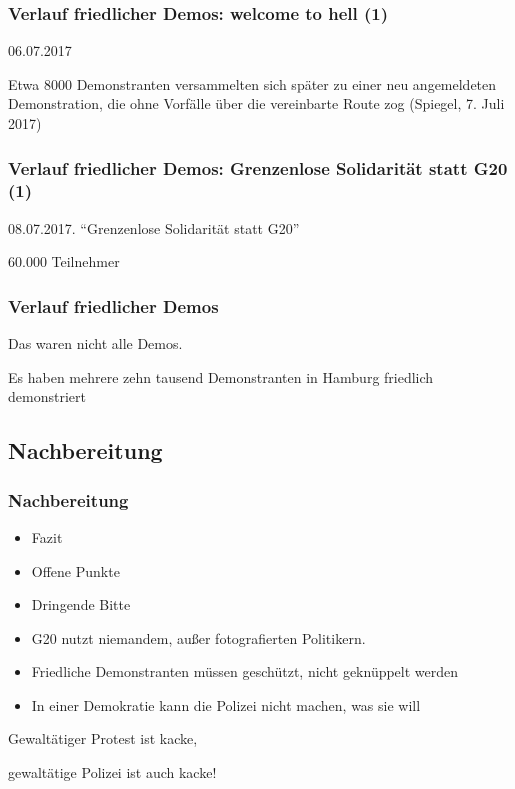 \documentclass[]{beamer}
\begin{document}
	\begin{frame}
	\frametitle{Verlauf friedlicher Demos: welcome to hell (1)}
	06.07.2017\par 
	Etwa 8000 Demonstranten versammelten sich später zu einer neu angemeldeten Demonstration, die ohne Vorfälle über die vereinbarte Route zog (Spiegel, 7. Juli 2017)
\end{frame}

	\begin{frame}
	\frametitle{Verlauf friedlicher Demos: Grenzenlose Solidarität statt G20 (1)}
		08.07.2017. \enquote{Grenzenlose Solidarität statt G20}\par
		60.000 Teilnehmer
\end{frame}

	\begin{frame}
	\frametitle{Verlauf friedlicher Demos}
	Das waren nicht alle Demos.\par
	\vfill
	\vfill
	Es haben mehrere zehn tausend Demonstranten in Hamburg friedlich demonstriert 
\end{frame}

	\begin{frame}
	\subsection{Nachbereitung}
	\frametitle{Nachbereitung}
	\begin{itemize}
		\item Fazit
		\item Offene Punkte
		\item Dringende Bitte
	\end{itemize}
\end{frame}

\begin{frame}
	\begin{itemize}
		\item G20 nutzt niemandem, außer fotografierten Politikern.
		\item Friedliche Demonstranten müssen geschützt, nicht geknüppelt werden
		\item In einer Demokratie kann die Polizei nicht machen, was sie will
	\end{itemize}
	\vfill
	Gewaltätiger Protest ist kacke, \par
	gewaltätige Polizei ist auch kacke!
\end{frame}
\end{document}
